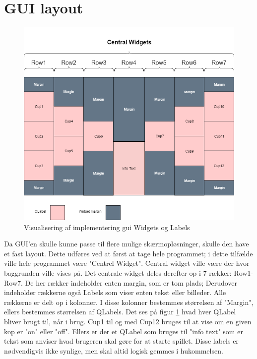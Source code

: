 \documentclass[Softwaredesign/Softwaredesign_main.tex]{subfiles}
\begin{document}
\section{GUI layout}
\begin{figure}
    \centering
    \includegraphics[scale=0.5]{Softwaredesign/GUI/Pictures/Boards_design.png}
    \caption{Visualisering af implementering gui Widgets og Labels}
    \label{gui_design_implementering}
\end{figure}

Da GUI'en skulle kunne passe til flere mulige skærmopløsninger, skulle den have et fast layout. Dette udføres ved at først at tage hele programmet; i dette tilfælde ville hele programmet være "Centrel Widget". Central widget ville være der hvor baggrunden ville vises på. Det centrale widget deles derefter op i 7 rækker: Row1-Row7. De her rækker indeholder enten margin, som er tom plads; Derudover indeholder rækkerne også Labels som viser enten tekst eller billeder. Alle rækkerne er delt op i kolonner. I disse kolonner bestemmes størrelsen af "Margin", ellers bestemmes størrelsen af QLabels. Det ses på figur \ref{gui_design_implementering} hvad hver QLabel bliver brugt til, når i brug. Cup1 til og med Cup12 bruges til at vise om en given kop er "on" eller "off". Ellers er der et QLabel som bruges til "info text" som er tekst som anviser hvad brugeren skal gøre for at starte spillet. Disse labels er nødvendigvis ikke synlige, men skal altid logisk gemmes i hukommelsen.
\end{document}
